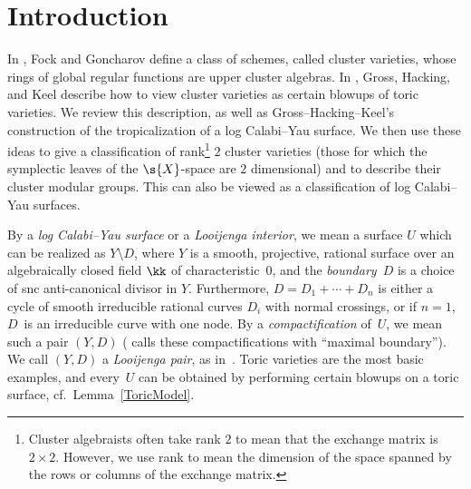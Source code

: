 \section{Introduction}\label{Introduction}

In \cite{FG1}, Fock and Goncharov define a class of schemes, called cluster varieties, whose rings of global regular functions are upper cluster algebras. In \cite{GHK3}, Gross, Hacking, and Keel describe how to view cluster varieties as certain blowups of toric varieties. We review this description, as well as Gross--Hacking--Keel's construction \cite{GHK1} of the tropicalization of a log Calabi--Yau surface. We then use these ideas to give a classification of rank\footnote{Cluster algebraists often take rank $2$ to mean that the exchange matrix is $2\times 2$. However, we use rank to mean the dimension of the space spanned by the rows or columns of the exchange matrix.} $2$ cluster varieties (those for which the symplectic leaves of the $\s{X}$-space are $2$ dimensional) and to describe their cluster modular groups. This can also be viewed as a classification of log Calabi--Yau surfaces.

By a {\it log Calabi--Yau surface} or a {\it Looijenga interior}, we mean a surface $U$ which can be realized as $Y\setminus D$, where $Y$ is a smooth, projective, rational surface over an algebraically closed field $\kk$ of characteristic~$0$, and the {\it boundary}~$D$ is a choice of snc anti-canonical divisor in $Y$. Furthermore, $D=D_1+\cdots + D_n$ is either a cycle of smooth irreducible rational curves $D_i$ with normal crossings, or if $n=1$, $D$~is an irreducible curve with one node. By a {\it compactification} of~$U$, we mean such a pair $(Y,D)$ (\cite{GHK2} calls these compactifications with ``maximal boundary''). We call $(Y,D)$ a {\it Looijenga pair}, as in~\cite{GHK1}. Toric varieties are the most basic examples, and every~$U$ can be obtained by performing certain blowups on a toric surface, cf.\ Lemma~\ref{ToricModel}.

